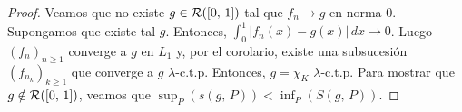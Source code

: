 \begin{prop}
\begin{proof}
        Veamos que no existe \(g \in \mathcal{R}([0 \text{, } 1])\) tal que \(f_n \to g\) en norma \(0\). Supongamos que existe tal \(g\). Entonces, \(\int_{0}^{1} |f_n(x) - g(x)| \, dx \to 0\). Luego \((f_n)_{n \geq 1}\) converge a \(g\) en \(L_1\) y, por el corolario, existe una subsucesión
        \((f_{n_k})_{k \geq 1}\) que converge a \(g\) \(\lambda\)-c.t.p. Entonces, \(g = \chi_K\) \(\lambda\)-c.t.p. Para mostrar que \(g \notin \mathcal{R}([0 \text{, } 1])\), veamos que \(\sup_P(s(g\text{, } P)) < \inf_P(S(g\text{, } P))\).
    \end{proof}
\end{prop}